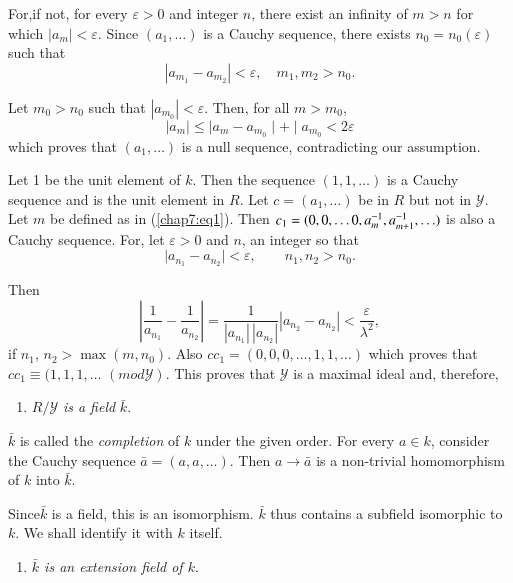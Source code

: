 For,\pageoriginale if not, for every $ \varepsilon > 0 $ and integer
$n$, there exist an infinity of $ m > n $ for which $ \mid a_m \mid <
\varepsilon $. Since $ ( a_1, \ldots ) $ is a Cauchy sequence, there
exists  $ n_0 = n_0  (\varepsilon) $ such that    
$$
| a_{m_{1}} - a_{m_{2}}| < \varepsilon , \quad m_1 ,m_2 > n_0 .
$$

Let $ m_0 > n_0 $ such that $ | a_{m_{0}}| < \varepsilon
$. Then, for all $ m > m_0 $, 
$$
| a_m | \leq | a_m - a_{m_0} \mid +    \mid a_{m_{0}}  < 2 
\varepsilon  
$$
which proves that $ ( a_1 , \ldots ) $ is a null sequence,
contradicting our assumption. 


Let 1 be the unit element of $k$. Then the  sequence  $ ( 1, 1,
\ldots ) $ is a Cauchy sequence  and is the unit element in $R$. Let $
c= ( a_1 , \ldots ) $ be in $R$ but not in $ \mathscr{Y} $. Let $m$ be
defined as in  (\ref{chap7:eq1}). Then $ c_1 =  ( 0, 0, \ldots 0, a^{-1}_{m},\break
a^{-1}_{m+1} , \ldots ) $ is also a  Cauchy sequence. For, let $
\varepsilon > 0 $ and $n$, an integer so that  
$$
\mid a_{n_{1}}  - a_{n_{2}} \mid < \varepsilon  ,\qquad  n_1, n_2 > n_0 .
$$ 

Then
$$
\left| \frac{1}{a_{n_{1}}} -\frac{1}{a_{n_{2}}} \right| =
\frac{1}{| a_{n_1} | \, | a_{n_2}|} \left| a_{n_{2}} - a_{n_2} \right|
< \frac{\varepsilon}{\lambda^2},
$$
 if $ n_1$, $n_2 > \max ( m, n_0 ) $. Also $ c c_1 = ( 0, 0, 0, \ldots ,
 1,  1 ,\ldots ) $  which proves that  $ c c_1 \equiv ( 1, 1, 1,
 \ldots $  
 $ ( mod \mathscr{Y} ) $. This proves that $ \mathscr{Y} $ is a
 maximal ideal and, therefore, 
\begin{enumerate}[1)]
\item $R/ \mathscr{Y} $ \textit{is a field} $ \bar{k} $.
\end{enumerate}

$ \bar{k} $ is called the \textit{completion} of $k$ under the given
order. For every  $ a \in k $, consider the Cauchy sequence $
\bar{a} = ( a, a, \ldots ) $. Then $ a \rightarrow \bar{a} $ is a
non-trivial homomorphism of  $k$  into $ \bar{k} $. 

Since\pageoriginale $\bar{k}$ is a field, this is an isomorphism. $
\bar{k} $ thus contains a subfield isomorphic to $k$. We shall
identify it with $k$ itself.  

\begin{enumerate}
\renewcommand{\labelenumi}{(\theenumi)}
\setcounter{enumi}{1}
\item \textit{$ \bar{k} $ is an extension field of $k$}.
\end{enumerate}

